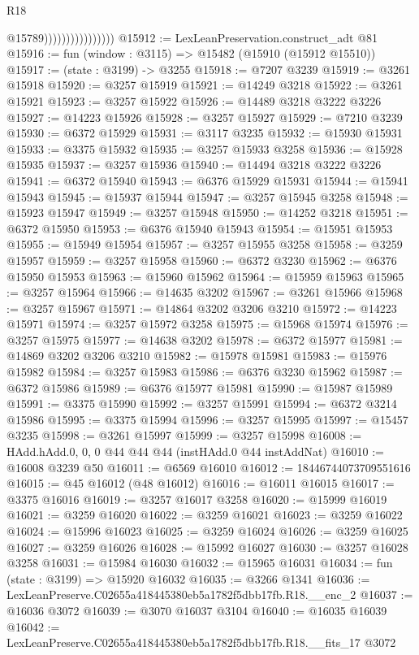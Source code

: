 \begin{lexlean}{R18}
\begin{coremodule}
                                    @15789))))))))))))))))
@15912 := LexLeanPreservation.construct_adt @81
@15916 := fun (window : @3115) => @15482 (@15910 (@15912 @15510))
@15917 := (state : @3199) -> @3255
@15918 := @7207 @3239
@15919 := @3261 @15918
@15920 := @3257 @15919
@15921 := @14249 @3218
@15922 := @3261 @15921
@15923 := @3257 @15922
@15926 := @14489 @3218 @3222 @3226
@15927 := @14223 @15926
@15928 := @3257 @15927
@15929 := @7210 @3239
@15930 := @6372 @15929
@15931 := @3117 @3235
@15932 := @15930 @15931
@15933 := @3375 @15932
@15935 := @3257 @15933 @3258
@15936 := @15928 @15935
@15937 := @3257 @15936
@15940 := @14494 @3218 @3222 @3226
@15941 := @6372 @15940
@15943 := @6376 @15929 @15931
@15944 := @15941 @15943
@15945 := @15937 @15944
@15947 := @3257 @15945 @3258
@15948 := @15923 @15947
@15949 := @3257 @15948
@15950 := @14252 @3218
@15951 := @6372 @15950
@15953 := @6376 @15940 @15943
@15954 := @15951 @15953
@15955 := @15949 @15954
@15957 := @3257 @15955 @3258
@15958 := @3259 @15957
@15959 := @3257 @15958
@15960 := @6372 @3230
@15962 := @6376 @15950 @15953
@15963 := @15960 @15962
@15964 := @15959 @15963
@15965 := @3257 @15964
@15966 := @14635 @3202
@15967 := @3261 @15966
@15968 := @3257 @15967
@15971 := @14864 @3202 @3206 @3210
@15972 := @14223 @15971
@15974 := @3257 @15972 @3258
@15975 := @15968 @15974
@15976 := @3257 @15975
@15977 := @14638 @3202
@15978 := @6372 @15977
@15981 := @14869 @3202 @3206 @3210
@15982 := @15978 @15981
@15983 := @15976 @15982
@15984 := @3257 @15983
@15986 := @6376 @3230 @15962
@15987 := @6372 @15986
@15989 := @6376 @15977 @15981
@15990 := @15987 @15989
@15991 := @3375 @15990
@15992 := @3257 @15991
@15994 := @6372 @3214 @15986
@15995 := @3375 @15994
@15996 := @3257 @15995
@15997 := @15457 @3235
@15998 := @3261 @15997
@15999 := @3257 @15998
@16008 := HAdd.hAdd.{0, 0, 0} @44 @44 @44 (instHAdd.{0} @44 instAddNat)
@16010 := @16008 @3239 @50
@16011 := @6569 @16010
@16012 := 18446744073709551616
@16015 := @45 @16012 (@48 @16012)
@16016 := @16011 @16015
@16017 := @3375 @16016
@16019 := @3257 @16017 @3258
@16020 := @15999 @16019
@16021 := @3259 @16020
@16022 := @3259 @16021
@16023 := @3259 @16022
@16024 := @15996 @16023
@16025 := @3259 @16024
@16026 := @3259 @16025
@16027 := @3259 @16026
@16028 := @15992 @16027
@16030 := @3257 @16028 @3258
@16031 := @15984 @16030
@16032 := @15965 @16031
@16034 := fun (state : @3199) => @15920 @16032
@16035 := @3266 @1341
@16036 := LexLeanPreserve.C02655a418445380eb5a1782f5dbb17fb.R18.__enc_2
@16037 := @16036 @3072
@16039 := @3070 @16037 @3104
@16040 := @16035 @16039
@16042 := LexLeanPreserve.C02655a418445380eb5a1782f5dbb17fb.R18.__fits_17 @3072

\end{coremodule}
\end{lexlean}
